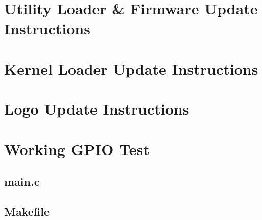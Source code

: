 \documentclass[]{article}
\begin{document}
\newpage 
\begin{appendices}
	\section{Utility Loader \& Firmware Update Instructions}
		
		\label{app:utilLoader}
	\section{Kernel Loader Update Instructions}
		\label{app:kernelLoader}
		
	\section{Logo Update Instructions}
		
	\section{Working GPIO Test}
		\label{app:gpio}
		\subsection{main.c}
		
		\subsection{Makefile}
		
		
\end{appendices}
\end{document}
